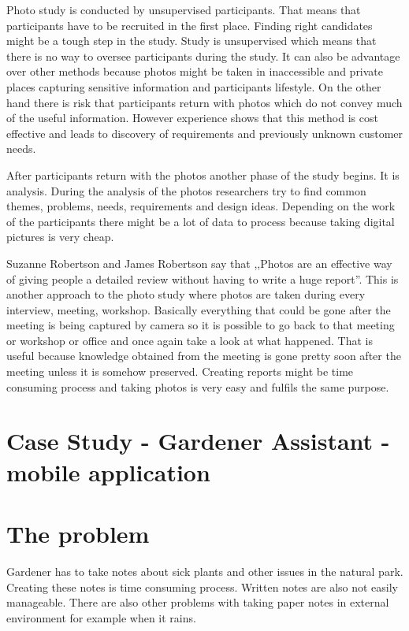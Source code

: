 \documentclass[12pt, a4paper]{article}
\begin{document}
Photo study is conducted by unsupervised participants. That means that participants have to be recruited in the first place. Finding right candidates might be a tough step in the study. Study is unsupervised which means that there is no way to oversee participants during the study. It can also be advantage over other methods because photos might be taken in inaccessible and private places capturing sensitive information and participants lifestyle. On the other hand there is risk that participants return with photos which do not convey much of the useful information. However experience shows that this method is cost effective and leads to discovery of requirements and previously unknown customer needs.

After participants return with the photos another phase of the study begins. It is analysis. During the analysis of the photos researchers try to find common themes, problems, needs, requirements and design ideas. Depending on the work of the participants there might be a lot of data to process because taking digital pictures is very cheap.

Suzanne Robertson and James Robertson say that ,,Photos are an effective way of giving people a detailed review without having to write a huge report''. \cite{robertson2006mastering} This is another approach to the photo study where photos are taken during every interview, meeting, workshop. Basically everything that could be gone after the meeting is being captured by camera so it is possible to go back to that meeting or workshop or office and once again take a look at what happened. That is useful because knowledge obtained from the meeting is gone pretty soon after the meeting unless it is somehow preserved. Creating reports might be time consuming process and taking photos is very easy and fulfils the same purpose.


\section{Case Study - Gardener Assistant - mobile application}
\section{The problem}
Gardener has to take notes about sick plants and other issues in the natural park. Creating these notes is time consuming process. Written notes are also not easily manageable. There are also other problems with taking paper notes in external environment for example when it rains.
\end{document}

